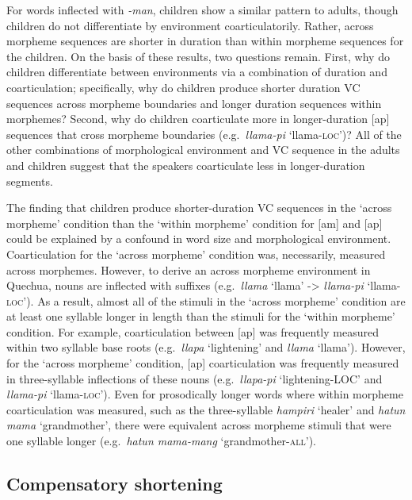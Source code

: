 \documentclass[
]{article}
\begin{document}
For words inflected with \emph{-man}, children show a similar pattern to adults, though children do not differentiate by environment coarticulatorily. Rather, across morpheme sequences are shorter in duration than within morpheme sequences for the children. On the basis of these results, two questions remain. First, why do children differentiate between environments via a combination of duration and coarticulation; specifically, why do children produce shorter duration VC sequences across morpheme boundaries and longer duration sequences within morphemes? Second, why do children coarticulate more in longer-duration {[}ap{]} sequences that cross morpheme boundaries (e.g.~\emph{llama-pi} `llama-\textsc{loc}')? All of the other combinations of morphological environment and VC sequence in the adults and children suggest that the speakers coarticulate less in longer-duration segments.

The finding that children produce shorter-duration VC sequences in the `across morpheme' condition than the `within morpheme' condition for {[}am{]} and {[}ap{]} could be explained by a confound in word size and morphological environment. Coarticulation for the `across morpheme' condition was, necessarily, measured across morphemes. However, to derive an across morpheme environment in Quechua, nouns are inflected with suffixes (e.g.~\emph{llama} `llama' -\textgreater{} \emph{llama-pi} `llama-\textsc{loc}'). As a result, almost all of the stimuli in the `across morpheme' condition are at least one syllable longer in length than the stimuli for the `within morpheme' condition. For example, coarticulation between {[}ap{]} was frequently measured within two syllable base roots (e.g.~\emph{llapa} `lightening' and \emph{llama} `llama'). However, for the `across morpheme' condition, {[}ap{]} coarticulation was frequently measured in three-syllable inflections of these nouns (e.g.~\emph{llapa-pi} `lightening-LOC' and \emph{llama-pi} `llama-\textsc{loc}'). Even for prosodically longer words where within morpheme coarticulation was measured, such as the three-syllable \emph{hampiri} `healer' and \emph{hatun mama} `grandmother', there were equivalent across morpheme stimuli that were one syllable longer (e.g.~\emph{hatun mama-mang} `grandmother-\textsc{all}').

\hypertarget{compensatory-shortening}{%
\subsection{Compensatory shortening}\label{compensatory-shortening}}
\end{document}
